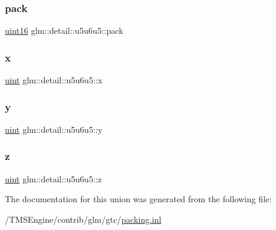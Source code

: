 \mbox{\label{unionglm_1_1detail_1_1u5u6u5_a5ea89c1a491b7e1442cad93d92628b2e}} 
\subsubsection{\texorpdfstring{pack}{pack}}
{\footnotesize\ttfamily \hyperlink{namespaceglm_1_1detail_a47b2a7d006d187338e8031a352d1ce56}{uint16} glm\+::detail\+::u5u6u5\+::pack}

\mbox{\label{unionglm_1_1detail_1_1u5u6u5_ae265d637dd0e4430f3e96a509e19fb06}} 
\subsubsection{\texorpdfstring{x}{x}}
{\footnotesize\ttfamily \hyperlink{group__core__precision_ga4fd29415871152bfb5abd588334147c8}{uint} glm\+::detail\+::u5u6u5\+::x}

\mbox{\label{unionglm_1_1detail_1_1u5u6u5_ab60581ca18c5faa107d8cbd5cfa946c9}} 
\subsubsection{\texorpdfstring{y}{y}}
{\footnotesize\ttfamily \hyperlink{group__core__precision_ga4fd29415871152bfb5abd588334147c8}{uint} glm\+::detail\+::u5u6u5\+::y}

\mbox{\label{unionglm_1_1detail_1_1u5u6u5_ae0c24b8bea4457e78fe32f6e0cee6369}} 
\subsubsection{\texorpdfstring{z}{z}}
{\footnotesize\ttfamily \hyperlink{group__core__precision_ga4fd29415871152bfb5abd588334147c8}{uint} glm\+::detail\+::u5u6u5\+::z}



The documentation for this union was generated from the following file\+:\begin{DoxyCompactItemize}
\item 
/\+T\+M\+S\+Engine/contrib/glm/gtc/\hyperlink{packing_8inl}{packing.\+inl}\end{DoxyCompactItemize}
